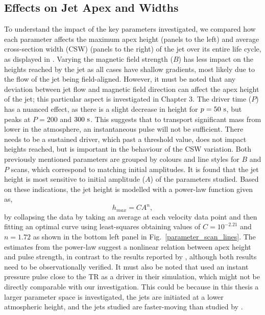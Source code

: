 \subsection{Effects on Jet Apex and Widths}
\label{subsec:jet_apex_widths}
To understand the impact of the key parameters investigated, we compared how each parameter affects the maximum apex height (panels to the left) and average cross-section width (CSW) (panels to the right) of the jet over its entire life cycle, as displayed in . Varying the magnetic field strength ($B$) has less impact on the heights reached by the jet as all cases have shallow gradients, most likely due to the flow of the jet being field-aligned. However, it must be noted that any deviation between jet flow and magnetic field direction can affect the apex height of the jet; this particular aspect is investigated in Chapter 3. The driver time ($P$) has a nuanced effect, as there is a slight decrease in height for $p=50~\rm{s}$, but peaks at $P=200$ and $300~\rm{s}$. This suggests that to transport significant mass from lower in the atmosphere, an instantaneous pulse will not be sufficient. There needs to be a sustained driver, which past a threshold value, does not impact heights reached, but is important in the behaviour of the CSW variation. Both previously mentioned parameters are grouped by colours and line styles for $B$ and $P$ scans, which correspond to matching initial amplitudes. It is found that the jet height is most sensitive to initial amplitude ($A$) of the parameters studied. Based on these indications, the jet height is modelled with a power-law function given as,  
\begin{equation}
h_{max} = C A^{n},
\end{equation}
by collapsing the data by taking an average at each velocity data point and then fitting an optimal curve using least-squares obtaining values of $C= 10^{-2.21}$ and $n= 1.72$ as shown in the bottom left panel in Fig.~\ref{parameter_scan_lines}. The estimates from the power-law suggest a nonlinear relation between apex height and pulse strength, in contrast to the results reported by \citet{Singh2019}, although both results need to be observationally verified. It must also be noted that \citet{Singh2019} used an instant pressure pulse close to the TR as a driver in their simulation, which might not be directly comparable with our investigation. This could be because in this thesis a larger parameter space is investigated, the jets are initiated at a lower atmospheric height, and the jets studied are faster-moving than studied by \citet{Singh2019}. \np 
